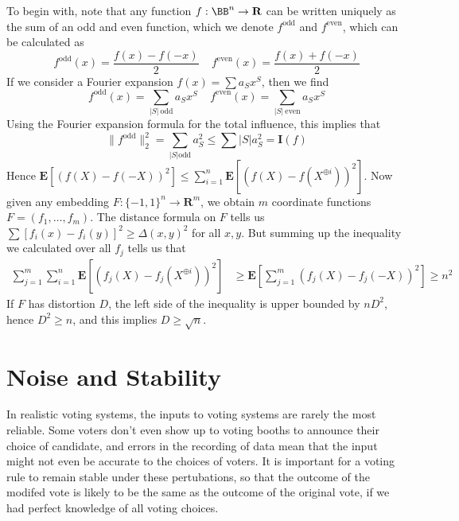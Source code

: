 To begin with, note that any function $f: \BB^n \to \mathbf{R}$ can be written uniquely as the sum of an odd and even function, which we denote $f^{\text{odd}}$ and $f^{\text{even}}$, which can be calculated as
%
\[ f^{\text{odd}}(x) = \frac{f(x) - f(-x)}{2}\ \ \ \ \ f^{\text{even}}(x) = \frac{f(x) + f(-x)}{2} \]
%
If we consider a Fourier expansion $f(x) = \sum a_S x^S$, then we find
%
\[ f^{\text{odd}}(x) = \sum_{|S|\ \text{odd}} a_S x^S\ \ \ \ \ f^{\text{even}}(x) = \sum_{|S|\ \text{even}} a_S x^S \]
%
Using the Fourier expansion formula for the total influence, this implies that
%
\[ \| f^{\text{odd}} \|_2^2 = \sum_{|S| \text{odd}} a_S^2 \leq \sum |S| a_S^2 = \mathbf{I}(f) \]
%
Hence $\mathbf{E}[(f(X) - f(-X))^2] \leq \sum_{i = 1}^n \mathbf{E}[(f(X) - f(X^{\oplus i}))^2]$. Now given any embedding $F: \{ -1, 1\}^n \to \mathbf{R}^m$, we obtain $m$ coordinate functions $F = (f_1, \dots, f_m)$. The distance formula on $F$ tells us $\sum [f_i(x) - f_i(y)]^2 \geq \Delta(x,y)^2$ for all $x,y$. But summing up the inequality we calculated over all $f_j$ tells us that
%
\begin{align*}
    \sum_{j = 1}^m \sum_{i = 1}^n \mathbf{E}[(f_j(X) - f_j(X^{\oplus i}))^2] &\geq \mathbf{E} \left[ \sum_{j = 1}^m (f_j(X) - f_j(-X))^2 \right] \geq n^2
\end{align*}
%
If $F$ has distortion $D$, the left side of the inequality is upper bounded by $nD^2$, hence $D^2 \geq n$, and this implies $D \geq \sqrt{n}$.

\section{Noise and Stability}

In realistic voting systems, the inputs to voting systems are rarely the most reliable. Some voters don't even show up to voting booths to announce their choice of candidate, and errors in the recording of data mean that the input might not even be accurate to the choices of voters. It is important for a voting rule to remain stable under these pertubations, so that the outcome of the modifed vote is likely to be the same as the outcome of the original vote, if we had perfect knowledge of all voting choices.

